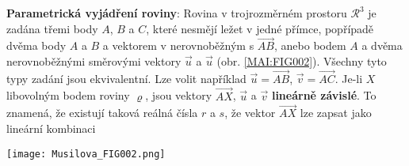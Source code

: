 
\begin{example}\label{mai:exam004}
  \textbf{Parametrická vyjádření roviny}:\newline
  Rovina v trojrozměrném prostoru \(\mathcal{R}^3\) je zadána třemi body \(A\), \(B\) a \(C\), 
  které nesmějí ležet v jedné přímce, popřípadě dvěma body \(A\) a \(B\) a vektorem v nerovnoběžným 
  s \(\overrightarrow{AB}\), anebo bodem \(A\) a dvěma nerovnoběžnými směrovými vektory \(\vec{u}\) 
  a \(\vec{u}\) (obr. \ref{MAI:FIG002}). Všechny tyto typy zadání jsou ekvivalentní. Lze volit 
  například \(\vec{u} = \overrightarrow{AB}\), \(\vec{v} = \overrightarrow{AC}\). Je-li \(X\) 
  libovolným bodem roviny \(\varrho\), jsou vektory \(\overrightarrow{AX}\), \(\vec{u}\) a 
  \(\vec{v}\) \textbf{lineárně závislé}. To znamená, že existují taková reálná čísla \(r\) a \(s\), 
  že vektor \(\overrightarrow{AX}\) lze zapsat jako lineární kombinaci

  {\centering
    \captionsetup{type=figure}
    \texttt{[image: Musilova\_FIG002.png]}
    \label{MAI:FIG002}
    \par}  
  
\end{example}
  
